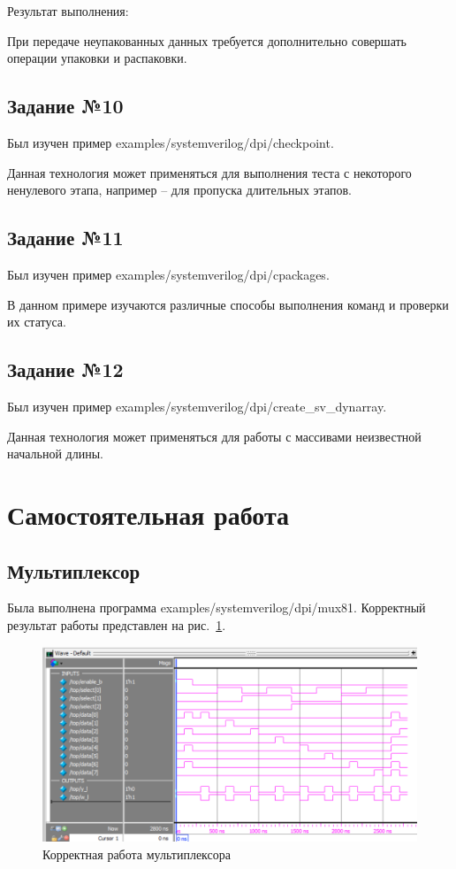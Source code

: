 \documentclass[a4paper,14pt]{article}
\begin{document}
    Результат выполнения:
    {\small {}}

    При передаче неупакованных данных требуется дополнительно совершать операции упаковки и распаковки.

    \subsection{Задание №10}

    Был изучен пример examples/systemverilog/dpi/checkpoint.

    Данная технология может применяться для выполнения теста с некоторого ненулевого этапа,
    например -- для пропуска длительных этапов.

    \subsection{Задание №11}

    Был изучен пример examples/systemverilog/dpi/cpackages.

    В данном примере изучаются различные способы выполнения команд и проверки их статуса.

    \subsection{Задание №12}

    Был изучен пример examples/systemverilog/dpi/create\_sv\_dynarray.

    Данная технология может применяться для работы с массивами неизвестной начальной длины.


    \section{Самостоятельная работа}

    \subsection{Мультиплексор}

    Была выполнена программа examples/systemverilog/dpi/mux81.
    Корректный результат работы представлен на рис.~\ref{fig:02_mux_ok}.

    \begin{figure}[H]
        \centering
        \includegraphics[width=\linewidth]{images/02_mux_ok}
        \caption{Корректная работа мультиплексора}
        \label{fig:02_mux_ok}
    \end{figure}
\end{document}
